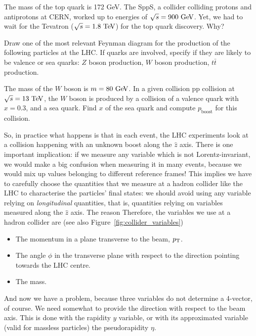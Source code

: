 \begin{exercise}
The mass of the top quark is 172 GeV. The SppS, a collider colliding protons and antiprotons at CERN, worked up to energies of $\sqrt{s} = 900\ \text{Ge\kern -0.1em V}$. Yet, we had to wait for the Tevatron ($\sqrt{s} = 1.8\ \TeV$) for the top quark discovery. Why?
\end{exercise}

\begin{exercise}
Draw one of the most relevant Feynman diagram for the production of the following particles at the LHC. If quarks are involved, specify if they are likely to be valence or sea quarks: $Z$ boson production, $W$ boson production, $t\bar{t}$ production.
\end{exercise}

\begin{exercise}
The mass of the $W$ boson is $m = 80\ \text{Ge\kern -0.1em V}$. In a given collision pp collision at $\sqrt{s} = 13\ \TeV$, the $W$ boson is produced by a collision of a valence quark with $x = 0.3$,  and a sea quark. Find $x$ of the sea quark and compute $p_{\mathrm{boost}}$ for this collision.
\end{exercise}


So, in practice what happens is that in each event, the LHC experiments look at a collision happening with an unknown boost along the $\hat{z}$ axis. There is one important implication: if we measure any variable which is not Lorentz-invariant, we would make a big confusion when measuring it in many events, because we would mix up values belonging to different reference frames! This implies we have to carefully choose the quantities that we measure at a hadron collider like the LHC to characterise the particles' final states: we should avoid using any variable relying on \textit{longitudinal} quantities, that is, quantities relying on variables measured along the $\hat{z}$ axis. The reason  Therefore, the variables we use at a hadron collider are (see also Figure~\ref{fig:collider_variables}) 

\begin{itemize}
\item The momentum in a plane transverse to the beam, $p_{\mathrm{T}}$.
\item The angle $\phi$ in the transverse plane with respect to the direction pointing towards the LHC centre.
\item The mass.
\end{itemize}

And now we have a problem, because three variables do not determine a 4-vector, of course. We need somewhat to provide the direction with respect to the beam axis. This is done with the rapidity $y$ variable, or with its approximated variable (valid for massless particles) the pseudorapidity $\eta$. 

